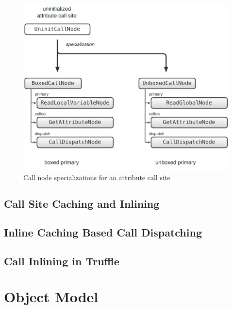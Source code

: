 \begin{figure}
\centering
\includegraphics[scale=.5]{figures/ch5-call-node-specialization-attribute}
\caption{Call node specializations for an attribute call site}
\label{fig:ch5-call-node-specialization-attribute}
\end{figure}



\subsection{Call Site Caching and Inlining}
\label{sec:ch5-call-site-caching-and-inlining}

\subsection{Inline Caching Based Call Dispatching}

\subsection{Call Inlining in Truffle}

\section{Object Model}
\label{sec:ch5-object-module}
